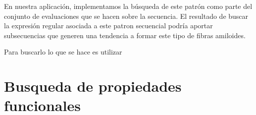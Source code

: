 
En nuestra aplicación, implementamos la búsqueda de este patrón como parte del conjunto de evaluaciones que se hacen sobre la secuencia.
El resultado de buscar la expresión regular asociada a este patron secuencial podría aportar subsecuencias que generen una tendencia a formar este tipo de fibras amiloides.

Para buscarlo lo que se hace es utilizar 























































\section{Busqueda de propiedades funcionales}







